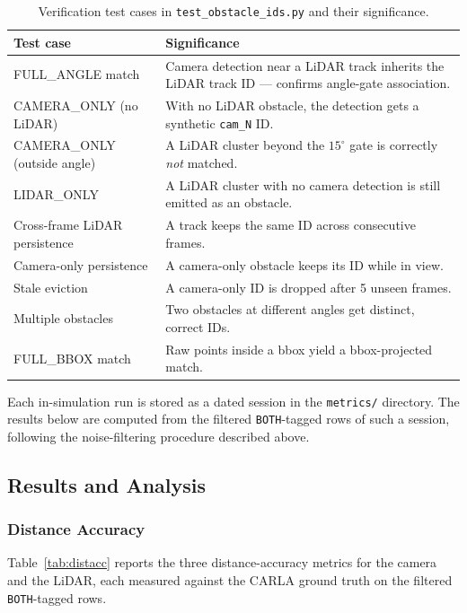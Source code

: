 \documentclass[12pt, a4paper]{report}
\begin{document}
\begin{table}[H]
\centering
\caption{Verification test cases in \texttt{test\_obstacle\_ids.py} and their significance.}
\label{tab:testcases}
\begin{tabular}{@{}p{}p{}@{}}
\toprule
\textbf{Test case} & \textbf{Significance} \\
\midrule
FULL\_ANGLE match            & Camera detection near a LiDAR track inherits the LiDAR track ID --- confirms angle-gate association. \\
CAMERA\_ONLY (no LiDAR)      & With no LiDAR obstacle, the detection gets a synthetic \texttt{cam\_N} ID. \\
CAMERA\_ONLY (outside angle) & A LiDAR cluster beyond the $15^\circ$ gate is correctly \emph{not} matched. \\
LIDAR\_ONLY                  & A LiDAR cluster with no camera detection is still emitted as an obstacle. \\
Cross-frame LiDAR persistence& A track keeps the same ID across consecutive frames. \\
Camera-only persistence      & A camera-only obstacle keeps its ID while in view. \\
Stale eviction               & A camera-only ID is dropped after 5 unseen frames. \\
Multiple obstacles           & Two obstacles at different angles get distinct, correct IDs. \\
FULL\_BBOX match             & Raw points inside a bbox yield a bbox-projected match. \\
\bottomrule
\end{tabular}
\end{table}

Each in-simulation run is stored as a dated session in the \texttt{metrics/}
directory. The results below are computed from the filtered \texttt{BOTH}-tagged
rows of such a session, following the noise-filtering procedure described above.

\subsection{Results and Analysis}

\subsubsection{Distance Accuracy}

Table~\ref{tab:distacc} reports the three distance-accuracy metrics for the
camera and the LiDAR, each measured against the CARLA ground truth on the
filtered \texttt{BOTH}-tagged rows.
\end{document}
